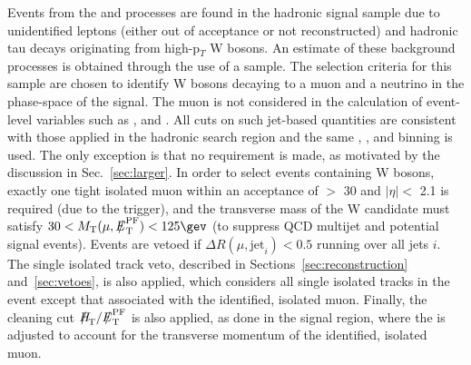 Events from the \wj and \ttbar processes are found in the hadronic
signal sample due to unidentified leptons (either out of acceptance or
not reconstructed) and hadronic tau decays originating from
high-p$_{T}$ W bosons. An estimate of these background processes is
obtained through the use of a \mj sample. The selection criteria for
this sample are chosen to identify W bosons decaying to a muon and a
neutrino in the phase-space of the signal. The muon is not considered
in the calculation of event-level variables such as \scalht, \mht and
\alphat. All cuts on such jet-based quantities are consistent with
those applied in the hadronic search region and the same \njet, \nb,
and \scalht binning is used. The only exception is that no \alphat
requirement is made, as motivated by the discussion in
Sec.~\ref{sec:larger}. In order to select events containing W bosons,
exactly one tight isolated muon within an acceptance of \PT $>$ 30
\gev and $|\eta| <$ 2.1 is required (due to the trigger), and the
transverse mass of the W candidate must satisfy $30 < \mt(\mu,\pfmet)
< 125\gev$ (to suppress QCD multijet and potential signal
events). Events are vetoed if $\Delta R(\mu,\textrm{jet}_i) < 0.5$
running over all jets $i$. The single isolated track veto, described
in Sections~\ref{sec:reconstruction} and~\ref{sec:vetoes}, is also
applied, which considers all single isolated tracks in the event
except that associated with the identified, isolated muon. Finally,
the cleaning cut $\mht/\pfmet$ is also applied, as done in the signal
region, where the \pfmet is adjusted to account for the transverse
momentum of the identified, isolated muon.

